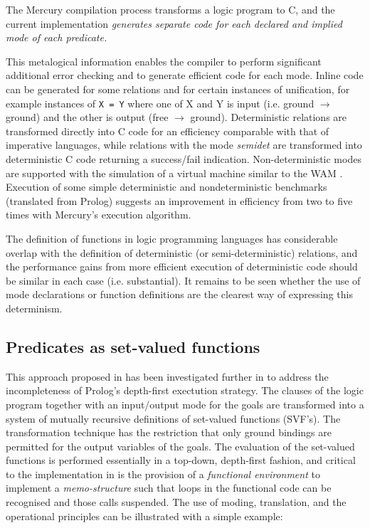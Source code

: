 The Mercury compilation process transforms a logic
program to C, and the current implementation \textit{generates separate code for each
declared and implied mode of each
predicate.}

This metalogical information enables the compiler to perform significant additional error
checking and to generate efficient code for each mode.  Inline code can be generated for some
relations and for certain instances of unification, for example instances of 
\texttt{X = Y} where one of X and Y is input (i.e. ground $\rightarrow$ ground) and the other is
output (free $\rightarrow$ ground).  Deterministic relations are transformed directly into C code for
an efficiency comparable with that of imperative languages, while relations with
the mode \textit{semidet}
are transformed into deterministic C code returning a success/fail indication.
Non-deterministic modes are supported with the simulation of a virtual machine similar to
the WAM \cite{AK90}.  Execution of some simple deterministic and nondeterministic benchmarks
(translated from Prolog) suggests an improvement in efficiency from two to five times with
Mercury's execution algorithm.

The definition of functions in logic programming languages has considerable overlap with the
definition of deterministic (or semi-deterministic) relations, and the performance gains from
more efficient execution of deterministic code should be similar in each case (i.e.
substantial).  It remains to be seen whether the use of mode declarations or
function definitions are the clearest way of expressing this determinism.

\subsection{Predicates as set-valued functions}

This approach proposed in \cite{Red84} has been investigated further in \cite{CSA87} to
address the incompleteness of Prolog's depth-first exectution strategy.  The clauses of the
logic program together with an input/output mode for the goals are transformed into a
system of mutually recursive definitions of set-valued functions (SVF's). The transformation technique
has the restriction that only ground bindings are permitted for the output variables of the
goals.  The evaluation of the set-valued functions is performed essentially in a top-down,
depth-first fashion, and critical to the implementation in \cite{CSA87} is the provision
of a \textit{functional environment} to implement a \textit{memo-structure} such that loops in
the functional code can be recognised and those calls suspended.  The use of moding,
translation, and the operational principles can be illustrated with a simple example:

